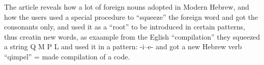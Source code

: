 The article reveals how a lot of foreign nouns adopted in Modern Hebrew, and how the users used a special procedure to ``squeeze'' the foreign word and got the consonants only, and used it as a ``root'' to be introduced in certain patterns, thus creatin new words, as exaample from the Eglish ``compilation'' they squeezed a string Q M P L and used it in a pattern: -i--e- and got a new Hebrew verb ``qimpel'' = made compilation of a code.
